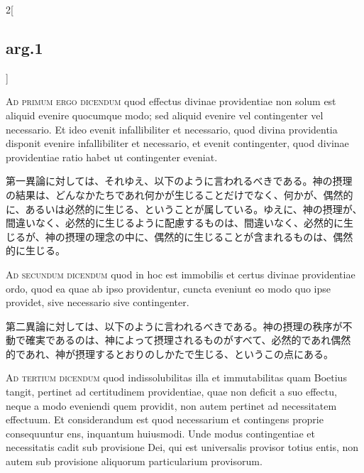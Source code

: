 \documentclass[paper=a4paper,fontsize=10pt,jafontsize=9pt,titlepage]{jlreq}
\begin{document}
\begin{paracol}{2}[\subsection{arg.1}]
\switchcolumn*[\subsection{ad.1}]

{\scshape Ad primum ergo dicendum} quod effectus divinae
providentiae non solum est aliquid evenire quocumque modo; sed aliquid
evenire vel contingenter vel necessario. Et ideo evenit infallibiliter
et necessario, quod divina providentia disponit evenire infallibiliter
et necessario, et evenit contingenter, quod divinae providentiae ratio
habet ut contingenter eveniat.

\switchcolumn

第一異論に対しては、それゆえ、以下のように言われるべきである。神の摂理
の結果は、どんなかたちであれ何かが生じることだけでなく、何かが、偶然的
に、あるいは必然的に生じる、ということが属している。ゆえに、神の摂理が、
間違いなく、必然的に生じるように配慮するものは、間違いなく、必然的に生
じるが、神の摂理の理念の中に、偶然的に生じることが含まれるものは、偶然
的に生じる。

\switchcolumn*[\subsection{ad.2}]

{\scshape Ad secundum dicendum} quod in hoc est
immobilis et certus divinae providentiae ordo, quod ea quae ab ipso
providentur, cuncta eveniunt eo modo quo ipse providet, sive necessario
sive contingenter.

\switchcolumn

第二異論に対しては、以下のように言われるべきである。神の摂理の秩序が不
動で確実であるのは、神によって摂理されるものがすべて、必然的であれ偶然
的であれ、神が摂理するとおりのしかたで生じる、というこの点にある。

\switchcolumn*[\subsection{ad.3}]

{\scshape Ad tertium dicendum} quod indissolubilitas
illa et immutabilitas quam Boetius tangit, pertinet ad certitudinem
providentiae, quae non deficit a suo effectu, neque a modo eveniendi
quem providit, non autem pertinet ad necessitatem effectuum. Et
considerandum est quod necessarium et contingens proprie consequuntur
ens, inquantum huiusmodi. Unde modus contingentiae et necessitatis cadit
sub provisione Dei, qui est universalis provisor totius entis, non autem
sub provisione aliquorum particularium provisorum.


\end{paracol}
\end{document}
